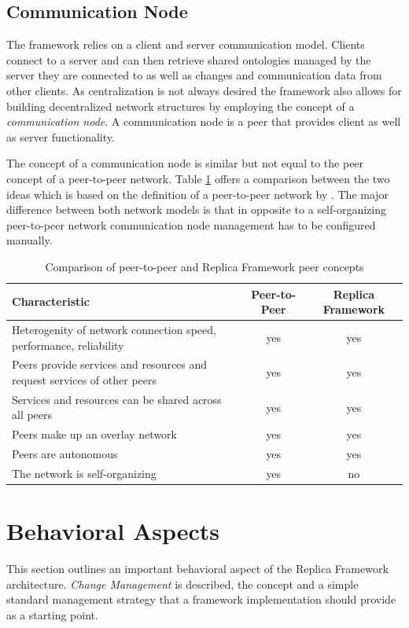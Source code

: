 \subsection{Communication Node}
The framework relies on a client and server communication model.
Clients connect to a server and can then retrieve shared ontologies managed
by the server they are connected to as well as changes and communication
data from other clients. As centralization is not always desired the
framework also allows for building decentralized network structures
by employing the concept of a \emph{communication node}.
A communication node is a peer that provides client as well as server functionality.

The concept of a communication node is similar but not equal to the
peer concept of a peer-to-peer network. Table \ref{p2pRepComparison}
offers a comparison between the two ideas which is based on the definition
of a peer-to-peer network by \cite{schollmeier01}.
The major difference between both network models is that in opposite to
a self-organizing peer-to-peer network communication node management has
to be configured manually.

\begin{table}[h]
        \centering
        \caption{Comparison of peer-to-peer and Replica Framework peer concepts}
        \label{p2pRepComparison}
        \begin{tabular}{ | p{} | c | c | }
                \hline
                \textbf{Characteristic} & \textbf{Peer-to-Peer} & \textbf{Replica Framework} \\ \hline
                Heterogenity of network connection speed, performance, reliability & yes &  yes \\ \hline
                Peers provide services and resources and request services of other peers & yes & yes \\ \hline
                Services and resources can be shared across all peers & yes & yes \\ \hline
                Peers make up an overlay network & yes & yes \\ \hline
                Peers are autonomous & yes & yes \\ \hline
                The network is self-organizing & yes & no \\ \hline
        \end{tabular}
\end{table}

\section{Behavioral Aspects}
This section outlines an important behavioral aspect of the Replica Framework
architecture. \emph{Change Management} is described, the
concept and a simple standard management strategy that a
framework implementation should provide as a starting point.

